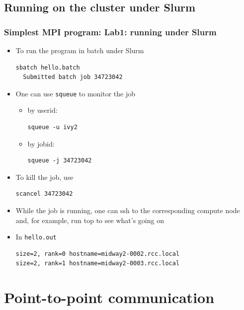 \documentclass{beamer}
\begin{document}
\subsection{Running on the cluster under Slurm}
\begin{frame}[fragile]
  \frametitle{Simplest MPI program: Lab1: running under Slurm}

\begin{itemize}
\item To run the program in batch under Slurm

{\color{mycolorcli}
\begin{verbatim}
sbatch hello.batch
  Submitted batch job 34723042
\end{verbatim}
}

\item One can use {\color{mycolorcli}\verb|squeue|} to monitor the job

  \begin{itemize}
  \item by userid:
    {\color{mycolorcli}
\begin{verbatim}
squeue -u ivy2
\end{verbatim}
    }
  \item by jobid:
    {\color{mycolorcli}
\begin{verbatim}
squeue -j 34723042
\end{verbatim}
    }
  \end{itemize}
\item To kill the job, use
{\color{mycolorcli}
\begin{verbatim}
scancel 34723042
\end{verbatim}
}
\item While the job is running, one can ssh to the corresponding compute node and, for example, run top to see what's going on
\item In {\color{mycolorcli}\verb|hello.out|}
  {\color{mycolorcli}
\begin{verbatim}
size=2, rank=0 hostname=midway2-0002.rcc.local
size=2, rank=1 hostname=midway2-0003.rcc.local
\end{verbatim}
  }
\end{itemize}
\end{frame}

\section{Point-to-point communication}
\end{document}
